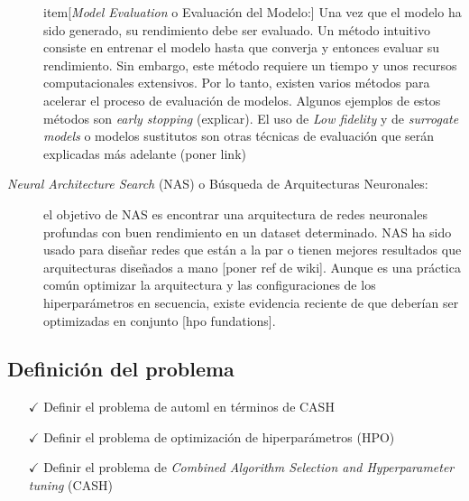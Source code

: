 \begin{description}
	item[\textit{Model Evaluation} o Evaluación del Modelo:] Una vez que el modelo ha sido generado, su rendimiento debe ser evaluado. Un método intuitivo consiste en entrenar el modelo hasta que converja y entonces evaluar su rendimiento. Sin embargo, este método requiere un tiempo y unos recursos computacionales extensivos. Por lo tanto, existen varios métodos para acelerar el proceso de evaluación de modelos. Algunos ejemplos de estos métodos son \textit{early stopping} (explicar). El uso de \textit{Low fidelity} y de \textit{surrogate models} o modelos sustitutos son otras técnicas de evaluación que serán explicadas más adelante (poner link)
	
	\item [\textit{Neural Architecture Search} (NAS) o Búsqueda de Arquitecturas Neuronales:] el objetivo de NAS es encontrar una arquitectura de redes neuronales profundas con buen rendimiento en un dataset determinado. NAS ha sido usado para diseñar redes que están a la par o tienen mejores resultados que arquitecturas diseñados a mano [poner ref de wiki]. Aunque es una práctica común optimizar la arquitectura y las configuraciones de los hiperparámetros en secuencia, existe evidencia reciente de que deberían ser optimizadas en conjunto [hpo fundations].
\end{description}

\subsection{Definición del problema}\label{subsec:automl_problem_definition}

\begin{itemize}
	\item[$\checkmark$] Definir el problema de automl en términos de CASH
	\item[$\checkmark$] Definir el problema de optimización de hiperparámetros (HPO) 
	\item[$\checkmark$] Definir el problema de \textit{Combined Algorithm Selection and Hyperparameter tuning} (CASH)
\end{itemize}

